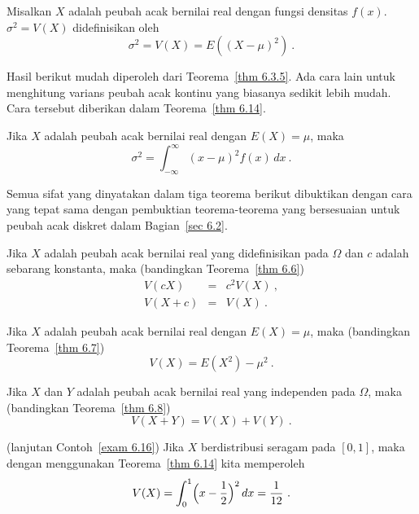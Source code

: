 {\begin{definition}\label{def 6.6} Misalkan $X$ adalah peubah acak bernilai real dengan
fungsi densitas $f(x)$.  $\sigma^2 = V(X)$ didefinisikan oleh
$$
\sigma^2 = V(X) = E((X - \mu)^2)\ . 
$$
\end{definition}
Hasil berikut mudah diperoleh dari Teorema~\ref{thm 6.3.5}. Ada cara lain untuk
menghitung varians peubah acak kontinu yang biasanya sedikit lebih mudah. Cara
tersebut diberikan dalam Teorema~\ref{thm 6.14}.
\begin{theorem}\label{thm 6.13.5} Jika $X$ adalah peubah acak bernilai real dengan
$E(X) = \mu$, maka
$$
\sigma^2 = \int_{-\infty}^\infty (x - \mu)^2 f(x)\, dx\ .
$$
\end{theorem}
\par Semua sifat yang dinyatakan dalam tiga teorema berikut dibuktikan dengan cara
yang tepat sama dengan pembuktian teorema-teorema yang bersesuaian untuk peubah acak
diskret dalam Bagian~\ref{sec 6.2}.
\begin{theorem}\label{thm 6.13} Jika $X$ adalah peubah acak bernilai real yang
didefinisikan pada $\Omega$ dan $c$ adalah sebarang konstanta, maka (bandingkan
Teorema~\ref{thm 6.6})
\begin{eqnarray*}
V(cX)    &=& c^2 V(X)\ , \\ 
V(X + c) &=& V(X)\ .
\end{eqnarray*}
\end{theorem}

\begin{theorem}\label{thm 6.14} Jika $X$ adalah peubah acak bernilai real dengan
$E(X) = \mu$, maka (bandingkan Teorema~\ref{thm 6.7})
$$ V(X) = E(X^2) - \mu^2\ .
$$
\end{theorem}

\begin{theorem}\label{thm 6.15} Jika $X$ dan $Y$ adalah peubah acak bernilai real yang
independen pada $\Omega$, maka (bandingkan Teorema~\ref{thm 6.8})
$$ V(X + Y) = V(X) + V(Y)\ .
$$
\end{theorem}

\begin{example} (lanjutan Contoh~\ref{exam 6.16})\label{exam 6.18.5} Jika $X$
berdistribusi seragam pada $[0, 1]$, maka dengan menggunakan Teorema~\ref{thm 6.14}
kita memperoleh
$$  V(X) = \int_0^1 \Bigl(x - \frac 12 \Bigr)^2\, dx = \frac 1{12}\ .
$$
\end{example}

}
